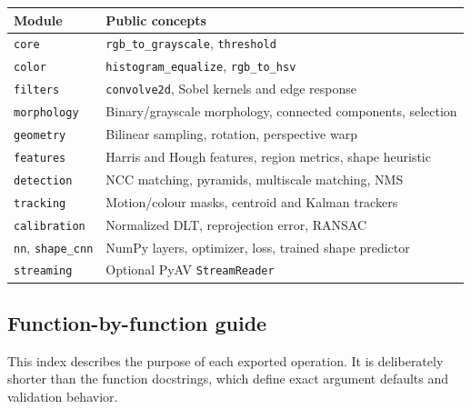 \documentclass[11pt,a4paper]{article}
\newcommand{\1}{\mathbf{1}}
\begin{document}
\begin{center}
\small
\begin{tabularx}{\textwidth}{@{}l X@{}}
\toprule
Module & Public concepts \\
\midrule
\texttt{core} & \texttt{rgb\_to\_grayscale}, \texttt{threshold} \\
\texttt{color} & \texttt{histogram\_equalize}, \texttt{rgb\_to\_hsv} \\
\texttt{filters} & \texttt{convolve2d}, Sobel kernels and edge response \\
\texttt{morphology} & Binary/grayscale morphology, connected components, selection \\
\texttt{geometry} & Bilinear sampling, rotation, perspective warp \\
\texttt{features} & Harris and Hough features, region metrics, shape heuristic \\
\texttt{detection} & NCC matching, pyramids, multiscale matching, NMS \\
\texttt{tracking} & Motion/colour masks, centroid and Kalman trackers \\
\texttt{calibration} & Normalized DLT, reprojection error, RANSAC \\
\texttt{nn}, \texttt{shape\_cnn} & NumPy layers, optimizer, loss, trained shape predictor \\
\texttt{streaming} & Optional PyAV \texttt{StreamReader} \\
\bottomrule
\end{tabularx}
\end{center}

\subsection{Function-by-function guide}

This index describes the purpose of each exported operation. It is deliberately
shorter than the function docstrings, which define exact argument defaults and
validation behavior.
\end{document}
